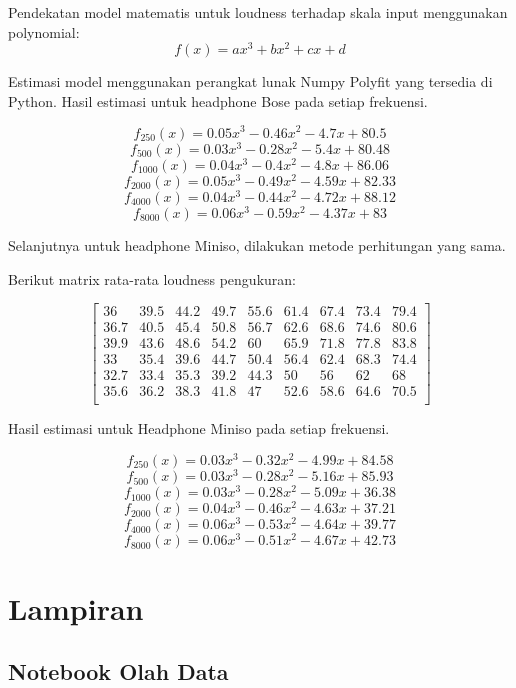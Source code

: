 \documentclass[12pt,]{article}
\begin{document}
		Pendekatan model matematis untuk loudness terhadap skala input menggunakan polynomial:\\
		\[f(x) = ax^3 + bx^2 + cx + d\]

		Estimasi model menggunakan perangkat lunak Numpy Polyfit yang tersedia di Python.
		Hasil estimasi untuk headphone Bose pada setiap frekuensi.

		\[f_{250}(x) = 0.05x^3 - 0.46x^2 - 4.7x + 80.5\]
		\[f_{500}(x) = 0.03x^3 - 0.28x^2 - 5.4x + 80.48\]
		\[f_{1000}(x) = 0.04x^3 - 0.4x^2 - 4.8x + 86.06\]
		\[f_{2000}(x) = 0.05x^3 - 0.49x^2 - 4.59x + 82.33\]
		\[f_{4000}(x) = 0.04x^3 - 0.44x^2 - 4.72x + 88.12\]
		\[f_{8000}(x) = 0.06x^3 - 0.59x^2 - 4.37x + 83\]


		Selanjutnya untuk headphone Miniso, dilakukan metode perhitungan yang sama.

		Berikut matrix rata-rata loudness pengukuran:

		\[\left[
		\begin{matrix}
			36   & 39.5 & 44.2 & 49.7 & 55.6 & 61.4 & 67.4 & 73.4 & 79.4 \\
			36.7 & 40.5 & 45.4 & 50.8 & 56.7 & 62.6 & 68.6 & 74.6 & 80.6 \\
			39.9 & 43.6 & 48.6 & 54.2 & 60   & 65.9 & 71.8 & 77.8 & 83.8 \\
			33   & 35.4 & 39.6 & 44.7 & 50.4 & 56.4 & 62.4 & 68.3 & 74.4 \\
			32.7 & 33.4 & 35.3 & 39.2 & 44.3 & 50   & 56   & 62   & 68   \\
			35.6 & 36.2 & 38.3 & 41.8 & 47   & 52.6 & 58.6 & 64.6 & 70.5 \\
		\end{matrix}
		\right]\]

        \newpage
		Hasil estimasi untuk Headphone Miniso pada setiap frekuensi.

		\[f_{250}(x) = 0.03x^3 - 0.32x^2 - 4.99x + 84.58\]
		\[f_{500}(x) = 0.03x^3 - 0.28x^2 - 5.16x + 85.93\]
		\[f_{1000}(x) = 0.03x^3 - 0.28x^2 - 5.09x + 36.38\]
		\[f_{2000}(x) = 0.04x^3 - 0.46x^2 - 4.63x + 37.21\]
		\[f_{4000}(x) = 0.06x^3 - 0.53x^2 - 4.64x + 39.77\]
		\[f_{8000}(x) = 0.06x^3 - 0.51x^2 - 4.67x + 42.73\]

	\newpage
	\section{Lampiran}

	\subsection{Notebook Olah Data}
	
\end{document}
